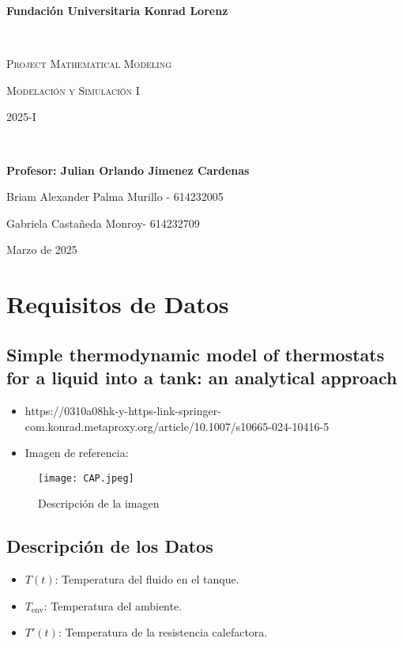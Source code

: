 \documentclass{article}
\begin{document}
\begin{titlepage}
\centering
{\bfseries\LARGE Fundación Universitaria Konrad Lorenz\par}
\vfill
\noindent\hrulefill \\
{\scshape\Huge Project Mathematical Modeling\par}
\vspace{0.5cm}
{\scshape\Large Modelación y Simulación I \par}
\vspace{0.5cm}
{\scshape\Large 2025-I \par} 
\noindent\hrulefill \\
\vfill
{\bfseries\Large Profesor: Julian Orlando Jimenez Cardenas\par}
\vfill
{\Large Briam Alexander Palma Murillo - 614232005\par}
{\Large Gabriela Castañeda Monroy- 614232709\par}
\vfill
{\large Marzo de 2025 \par} 
\end{titlepage}
\setcounter{page}{1}
\section {Requisitos de Datos}
\subsection{Simple thermodynamic model of thermostats for a liquid
into a tank: an analytical approach 
 }
 \begin{itemize}
    \item https://0310a08hk-y-https-link-springer-com.konrad.metaproxy.org/article/10.1007/s10665-024-10416-5
    
    \item Imagen de referencia:
\end{itemize}

\begin{figure}[h]
    \centering
    \texttt{[image: CAP.jpeg]}
    \caption{Descripción de la imagen}
    \label{fig:cap}
\end{figure}
 \subsection{Descripción de los Datos}
\begin{itemize} 

    \item \( T(t) \): Temperatura del fluido en el tanque.
    \item \( T_{\text{env}} \): Temperatura del ambiente.
    \item \( T'(t) \): Temperatura de la resistencia calefactora.
\end{itemize}
\end{document}
